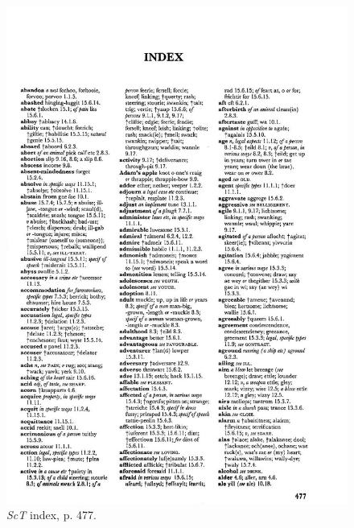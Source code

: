 \begin{figure}[htbp]
  \centering
    \includegraphics[width=\linewidth]{Stolk_thes-content/fig/thes/ScT-p477.jpg}
  \caption{\textit{ScT} index, p. 477.}
  \label{fig:1.A:ScT:index}
\end{figure}


